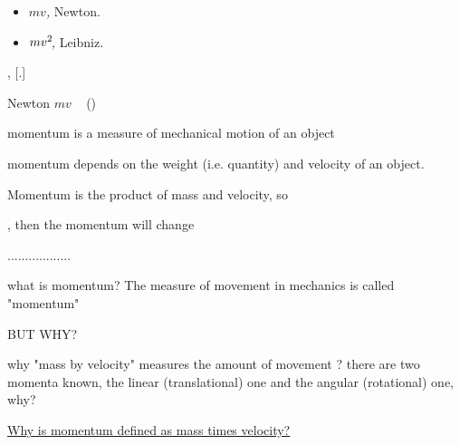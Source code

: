 \begin{itemize}%
\setlength{\labelsep}{.2em}
\setlength{\parskip}{.3ex}
\item[\thoughtQuote]
\textit{${m v}$,
\ru{\:---}
\ru{,}
}\hbox{\hspace{\labelsep}\rquote}
Newton.
\item[\thoughtQuote]
\textit{${m v^2 \hspace{-0.4ex}}$,
\ru{\:---}
\ru{,}
}\hbox{\hspace{\labelsep}\rquote}
Leibniz.
\end{itemize}

,
[.]

Newton
${mv}$
~%
()

momentum is a measure of mechanical motion of an object

momentum depends on the weight (i.e. quantity) and velocity of an object.

Momentum is the product of mass and velocity, so

,
then the momentum will change

..................

what is momentum? The measure of movement in mechanics is called "momentum"

BUT WHY?

why "mass by velocity" measures the amount of movement ?
there are two momenta known, the linear (translational) one and the angular (rotational) one, why?

\href{https://physics.stackexchange.com/questions/577332/why-is-momentum-defined-as-mass-times-velocity}{Why is momentum defined as mass times velocity?}

